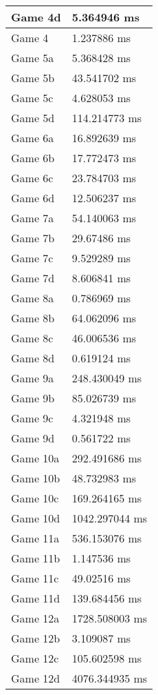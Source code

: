 \begin{multicols}{2}
\begin{tabular}{|l|l|}
	Game 4d & 5.364946 ms \\ \hline
	Game 4 & 1.237886 ms \\ \hline
	Game 5a & 5.368428 ms \\ \hline
	Game 5b & 43.541702 ms \\ \hline
	Game 5c & 4.628053 ms \\ \hline
	Game 5d & 114.214773 ms \\ \hline
	Game 6a & 16.892639 ms \\ \hline
	Game 6b & 17.772473 ms \\ \hline
	Game 6c & 23.784703 ms \\ \hline
	Game 6d & 12.506237 ms \\ \hline
	Game 7a & 54.140063 ms \\ \hline
	Game 7b & 29.67486 ms \\ \hline
	Game 7c & 9.529289 ms \\ \hline
	Game 7d & 8.606841 ms \\ \hline
	Game 8a & 0.786969 ms \\ \hline
	Game 8b & 64.062096 ms \\ \hline
	Game 8c & 46.006536 ms \\ \hline
	Game 8d & 0.619124 ms \\ \hline
	Game 9a & 248.430049 ms \\ \hline
	Game 9b & 85.026739 ms \\ \hline
	Game 9c & 4.321948 ms \\ \hline
	Game 9d & 0.561722 ms \\ \hline
	Game 10a & 292.491686 ms \\ \hline
	Game 10b & 48.732983 ms \\ \hline
	Game 10c & 169.264165 ms \\ \hline
	Game 10d & 1042.297044 ms \\ \hline
	Game 11a & 536.153076 ms \\ \hline
	Game 11b & 1.147536 ms \\ \hline
	Game 11c & 49.02516 ms \\ \hline
	Game 11d & 139.684456 ms \\ \hline
	Game 12a & 1728.508003 ms \\ \hline
	Game 12b & 3.109087 ms \\ \hline
	Game 12c & 105.602598 ms \\ \hline
	Game 12d & 4076.344935 ms \\ \hline
\end{tabular}\\

\end{multicols}
